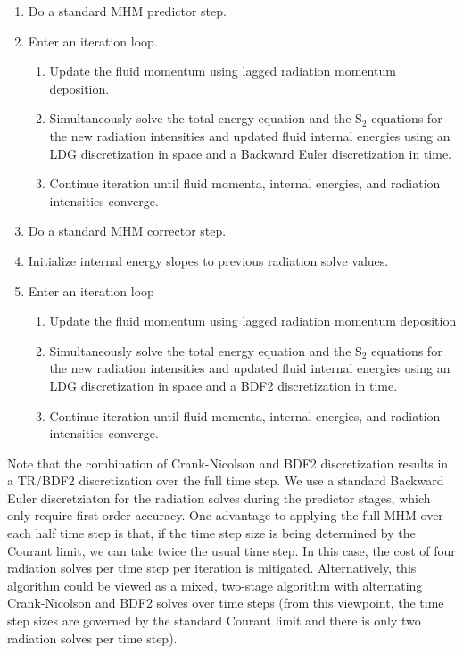 \documentclass[preprint,12pt]{elsarticle}
\begin{document}
\begin{enumerate}
  \item Do a standard MHM predictor step. 
  \item Enter an iteration loop.
  \begin{enumerate}
    \item Update the fluid momentum using lagged radiation momentum deposition.
    \item Simultaneously solve the total energy equation and the S$_2$ equations for the new radiation 
        intensities and updated fluid internal energies using an LDG discretization 
    in space and a Backward Euler discretization in time.
    \item Continue iteration until fluid momenta, internal energies, and radiation intensities converge.
  \end{enumerate}
  \item Do a standard MHM corrector step.
  \item Initialize internal energy slopes to previous radiation solve values.
  \item Enter an iteration loop
  \begin{enumerate}
  \item Update the fluid momentum using lagged radiation momentum deposition
  \item Simultaneously solve the total energy equation and the S$_2$ equations for the new radiation intensities and updated fluid internal energies 
	using an LDG discretization in space and a BDF2 discretization in time.
  \item Continue iteration until fluid momenta, internal energies, and radiation intensities converge.
  \end{enumerate}
\end{enumerate}
Note that the combination of Crank-Nicolson and BDF2 discretization results in a TR/BDF2 discretization over the full time step.  We use a standard Backward Euler discretziaton for the radiation solves during the predictor stages, which only require first-order accuracy.  One
advantage to applying the full MHM over each half time step is that, if the time step size is being determined by the Courant limit, we can
take twice the usual time step.  In this
case, the cost of four radiation solves per time step per iteration is mitigated.  Alternatively, this algorithm could be viewed as a mixed,
two-stage algorithm with alternating Crank-Nicolson and BDF2 solves over time steps (from this viewpoint, the time step sizes are governed
by the standard Courant limit and there is only two radiation solves per time step).  
\end{document}
